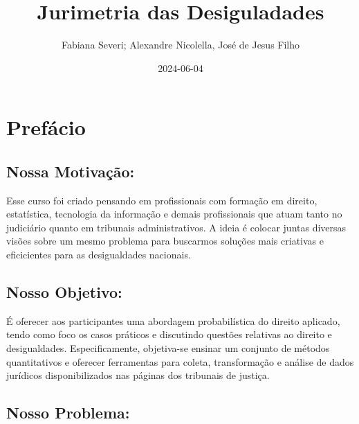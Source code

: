 \documentclass[
  letterpaper,
  DIV=11,
  numbers=noendperiod]{scrreprt}
\title{Jurimetria das Desiguladades}
\author{Fabiana Severi; Alexandre Nicolella, José de Jesus Filho}
\date{2024-06-04}
\renewcommand*\contentsname{Table of contents}
\newcommand\contentsname{Table of contents}
\begin{document}
\maketitle
\ifdefined\Shaded\renewenvironment{Shaded}{\begin{tcolorbox}[borderline west={3pt}{0pt}{shadecolor}, boxrule=0pt, interior hidden, breakable, sharp corners, enhanced, frame hidden]}{\end{tcolorbox}}\fi

\renewcommand*\contentsname{Table of contents}
{
\hypersetup{linkcolor=}
\setcounter{tocdepth}{2}
\tableofcontents
}

\hypertarget{prefuxe1cio}{%
\chapter{Prefácio}\label{prefuxe1cio}}

\hypertarget{nossa-motivauxe7uxe3o}{%
\section{\texorpdfstring{\textbf{Nossa
Motivação:}}{Nossa Motivação:}}\label{nossa-motivauxe7uxe3o}}

Esse curso foi criado pensando em profissionais com formação em direito,
estatística, tecnologia da informação e demais profissionais que atuam
tanto no judiciário quanto em tribunais administrativos. A ideia é
colocar juntas diversas visões sobre um mesmo problema para buscarmos
soluções mais criativas e eficicientes para as desigualdades nacionais.

\hypertarget{nosso-objetivo}{%
\section{\texorpdfstring{\textbf{Nosso
Objetivo}:}{Nosso Objetivo:}}\label{nosso-objetivo}}

É oferecer aos participantes uma abordagem probabilística do direito
aplicado, tendo como foco os casos práticos e discutindo questões
relativas ao direito e desigualdades. Especificamente, objetiva-se
ensinar um conjunto de métodos quantitativos e oferecer ferramentas para
coleta, transformação e análise de dados jurídicos disponibilizados nas
páginas dos tribunais de justiça.

\hypertarget{nosso-problema}{%
\section{\texorpdfstring{\textbf{Nosso
Problema}:}{Nosso Problema:}}\label{nosso-problema}}
\end{document}
